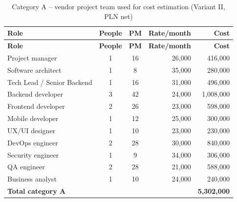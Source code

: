 \begin{longtable}{|L{5.0cm}|c|c|r|r|}
\caption{Category A -- vendor project team used for cost estimation (Variant II, PLN net)}
\label{tab:capex_zespol} \\
\hline
{}\textbf{Role} & \textbf{People} & \textbf{PM} & \textbf{Rate/month} & \textbf{Cost} \\
\hline
\endfirsthead
\hline
{}\textbf{Role} & \textbf{People} & \textbf{PM} & \textbf{Rate/month} & \textbf{Cost} \\
\hline
\endhead
Project manager & 1 & 16 & 26,000 & 416,000 \\
\hline
Software architect & 1 & 8 & 35,000 & 280,000 \\
\hline
Tech Lead / Senior Backend & 1 & 16 & 31,000 & 496,000 \\
\hline
Backend developer & 3 & 42 & 24,000 & 1,008,000 \\
\hline
Frontend developer & 2 & 26 & 23,000 & 598,000 \\
\hline
Mobile developer & 1 & 12 & 25,000 & 300,000 \\
\hline
UX/UI designer & 1 & 10 & 23,000 & 230,000 \\
\hline
DevOps engineer & 2 & 28 & 30,000 & 840,000 \\
\hline
Security engineer & 1 & 9 & 34,000 & 306,000 \\
\hline
QA engineer & 2 & 28 & 21,000 & 588,000 \\
\hline
Business analyst & 1 & 10 & 24,000 & 240,000 \\
\hline
{}\textbf{Total category A} & & & & \textbf{5,302,000} \\
\hline
\end{longtable}

